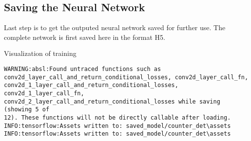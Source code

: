 \subsection{Saving the Neural Network}

Last step is to get the outputed neural network saved for further use. The complete network is first  saved here in the format H5.


\begin{code}
        
    
    \caption{Visualization of training} 
    
\end{code}    



\begin{verbatim}
WARNING:absl:Found untraced functions such as
conv2d_layer_call_and_return_conditional_losses, conv2d_layer_call_fn,
conv2d_1_layer_call_and_return_conditional_losses, conv2d_1_layer_call_fn,
conv2d_2_layer_call_and_return_conditional_losses while saving (showing 5 of
12). These functions will not be directly callable after loading.
INFO:tensorflow:Assets written to: saved_model/counter_det\assets
INFO:tensorflow:Assets written to: saved_model/counter_det\assets
\end{verbatim}






